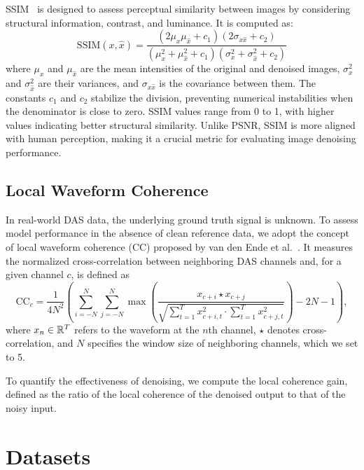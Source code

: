 SSIM~\cite{SSIM} is designed to assess perceptual similarity between images by considering structural information, contrast, and luminance. It is computed as:
\begin{equation}
\text{SSIM}(x, \hat{x}) = \frac{(2\mu_x \mu_{\hat{x}} + c_1)(2\sigma_{x\hat{x}} + c_2)}{(\mu_x^2 + \mu_{\hat{x}}^2 + c_1)(\sigma_x^2 + \sigma_{\hat{x}}^2 + c_2)}
\end{equation}
where $\mu_x$ and $\mu_{\hat{x}}$ are the mean intensities of the original and denoised images, $\sigma_x^2$ and $\sigma_{\hat{x}}^2$ are their variances, and $\sigma_{x\hat{x}}$ is the covariance between them.
The constants $c_1$ and $c_2$ stabilize the division, preventing numerical instabilities when the denominator is close to zero.
SSIM values range from 0 to 1, with higher values indicating better structural similarity.
Unlike PSNR, SSIM is more aligned with human perception, making it a crucial metric for evaluating image denoising performance.

\subsection{Local Waveform Coherence}\label{sec:CC}

In real-world DAS data, the underlying ground truth signal is unknown.
To assess model performance in the absence of clean reference data, we adopt the concept of local waveform coherence (CC) proposed by van den Ende et al.~\cite{DAS-N2S}.
It measures the normalized cross-correlation between neighboring DAS channels and, for a given channel $c$, is defined as
\begin{equation}
    \text{CC}_c = \frac{1}{4N^2} \left(\sum_{i=-N}^{N}\sum_{j=-N}^{N} \max \left(\frac{x_{c+i} \star x_{c+j}}{\sqrt{\sum_{t=1}^{T} x_{c+i,t}^2 \cdot \sum_{t=1}^{T} x_{c+j,t}^2}} \right) -2N -1 \right),
\end{equation}
where $x_n \in \mathbb{R}^T$ refers to the waveform at the $n$th channel, $\star$ denotes cross-correlation, and $N$ specifies the window size of neighboring channels, which we set to 5.

To quantify the effectiveness of denoising, we compute the local coherence gain, defined as the ratio of the local coherence of the denoised output to that of the noisy input.


\section{Datasets}


